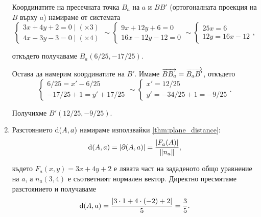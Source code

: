 \documentclass[
  headings=standardclasses,
  bibliography=totocnumbered,
]{scrartcl}
\begin{document}
\begin{solution}
\begin{enumerate}[label=\alph*)]
    Координатите на пресечната точка \( B_a \) на \( a \) и \( BB' \) (ортогоналната проекция на \( B \) върху \( a \)) намираме от системата
    \begin{equation*}
      \begin{cases}
        3x + 4y + 2 = 0 \mid (\times 3) \\
        4x - 3y - 3 = 0 \mid (\times 4)
      \end{cases}
      \sim
      \begin{cases}
        9x + 12y + 6 = 0 \\
        16x - 12y - 12 = 0
      \end{cases}
      \sim
      \begin{cases}
        25x = 6 \\
        12y = 16x - 12
      \end{cases},
    \end{equation*}

    откъдето получаваме \( B_a(6/25, -17/25) \).

    Остава да намерим координатите на \( B' \). Имаме \( \overrightarrow{BB_a} = \overrightarrow{B_a B'} \), откъдето
    \begin{equation*}
      \begin{cases}
        6/25 = x' - 6/25 \\
        -17/25 + 1 = y' + 17/25
      \end{cases}
      \sim
      \begin{cases}
        x' = 12/25 \\
        y' = -34/25 + 1 = -9/25
      \end{cases}.
    \end{equation*}

    Получихме \( B'(12/25, -9/25) \).

    \item Разстоянието \( \operatorname{d}(A, a) \) намираме използвайки \cref{thm:plane_distance}:
    \begin{equation*}
      \operatorname{d}(A, a) = \left\vert \partial(A, a) \right\vert = \frac {\left\vert F_a(A) \right\vert} {\left\Vert n_a \right\Vert},
    \end{equation*}

    където \( F_a(x, y) = 3x + 4y + 2 \) е лявата част на зададеното общо уравнение на \( a \), а \( n_a(3, 4) \) е съответният нормален вектор. Директно пресмятаме разстоянието и получаваме
    \begin{equation*}
      \operatorname{d}(A, a) = \frac {\left\vert 3 \cdot 1 + 4 \cdot (-2) + 2 \right\vert} 5 = \frac 3 5.
    \end{equation*}


\end{enumerate}
\end{solution}
\end{document}
